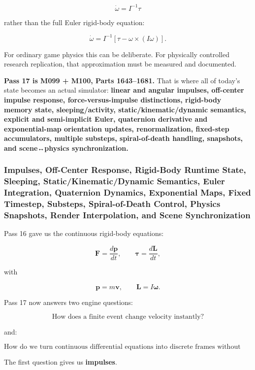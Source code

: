 \[
\dot\omega=I^{-1}\tau
\]

rather than the full Euler rigid-body equation:

\[
\boxed{
\dot\omega
=
I^{-1}
[
\tau-\omega\times(I\omega)
].
}
\]

For ordinary game physics this can be deliberate. For physically controlled research replication, that approximation must be measured and documented.

\textbf{Pass 17 is M099 + M100, Parts 1643--1681.} That is where all of today's state becomes an actual simulator: \textbf{linear and angular impulses, off-center impulse response, force-versus-impulse distinctions, rigid-body memory state, sleeping/activity, static/kinematic/dynamic semantics, explicit and semi-implicit Euler, quaternion derivative and exponential-map orientation updates, renormalization, fixed-step accumulators, multiple substeps, spiral-of-death handling, snapshots, and scene↔physics synchronization.}

\subsubsection{Impulses, Off-Center Response, Rigid-Body Runtime State, Sleeping, Static/Kinematic/Dynamic Semantics, Euler Integration, Quaternion Dynamics, Exponential Maps, Fixed Timestep, Substeps, Spiral-of-Death Control, Physics Snapshots, Render Interpolation, and Scene Synchronization}\label{impulses-off-center-response-rigid-body-runtime-state-sleeping-statickinematicdynamic-semantics-euler-integration-quaternion-dynamics-exponential-maps-fixed-timestep-substeps-spiral-of-death-control-physics-snapshots-render-interpolation-and-scene-synchronization}

Pass 16 gave us the continuous rigid-body equations:

\[
\mathbf F=\frac{d\mathbf p}{dt},
\qquad
\boldsymbol\tau=\frac{d\mathbf L}{dt},
\]

with

\[
\mathbf p=m\mathbf v,
\qquad
\mathbf L=I\boldsymbol\omega.
\]

Pass 17 now answers two engine questions:

\[
\boxed{\text{How does a finite event change velocity instantly?}}
\]

and:

\[
\boxed{\text{How do we turn continuous differential equations into discrete frames without destroying stability?}}
\]

The first question gives us \textbf{impulses}.

